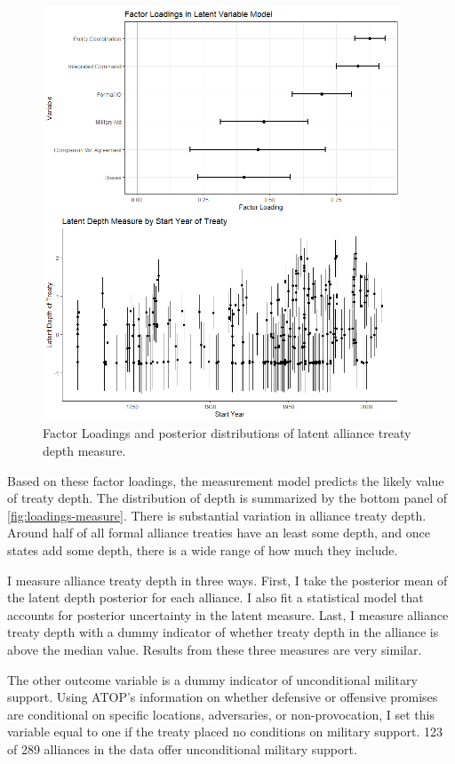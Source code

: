 \documentclass[12pt]{article}
\begin{document}
\begin{figure}[hbtp]
\centering
\includegraphics[width=0.95\textwidth]{../figures/loadings-measure.png}
\caption{Factor Loadings and posterior distributions of latent alliance treaty depth measure.}
\label{fig:loadings-measure}
\end{figure}


Based on these factor loadings, the measurement model predicts the likely value of treaty depth. 
The distribution of depth is summarized by the bottom panel of \autoref{fig:loadings-measure}. 
There is substantial variation in alliance treaty depth. 
Around half of all formal alliance treaties have an least some depth, and once states add some depth, there is a wide range of how much they include.


I measure alliance treaty depth in three ways.
First, I take the posterior mean of the latent depth posterior for each alliance. 
I also fit a statistical model that accounts for posterior uncertainty in the latent measure. 
Last, I measure alliance treaty depth with a dummy indicator of whether treaty depth in the alliance is above the median value. 
Results from these three measures are very similar. 


The other outcome variable is a dummy indicator of unconditional military support. 
Using ATOP's information on whether defensive or offensive promises are conditional on specific locations, adversaries, or non-provocation, I set this variable equal to one if the treaty placed no conditions on military support.
123 of 289 alliances in the data offer unconditional military support. 
\end{document}
